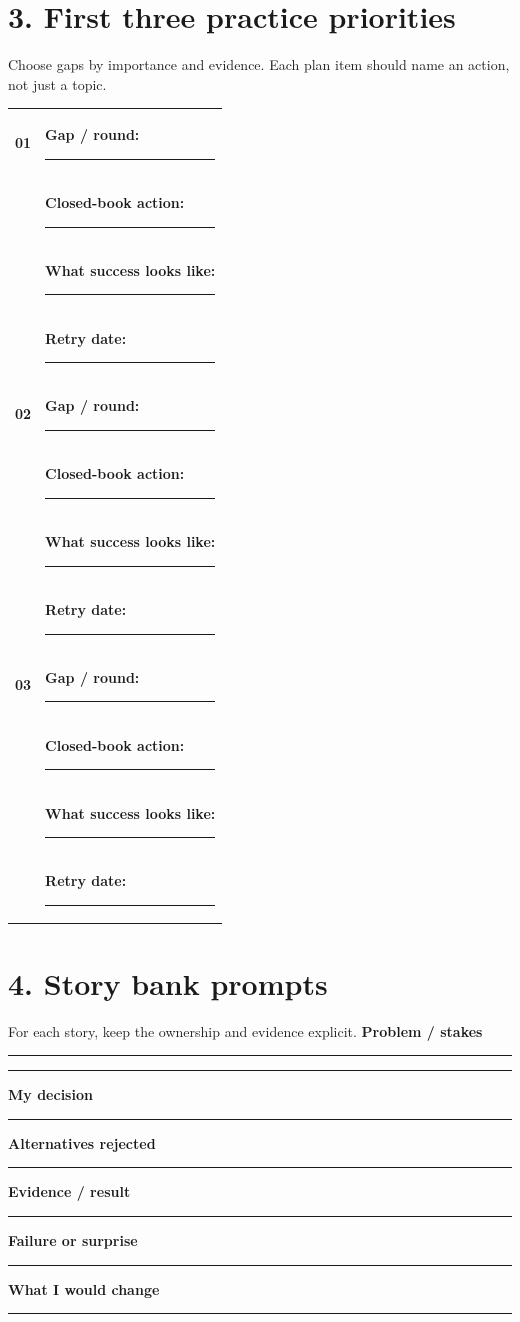 \documentclass[10pt,letterpaper]{article}
\newcommand{\longline}{\par\noindent\rule{\linewidth}{.35pt}\par\vspace{.35em}}
\begin{document}
\section*{3. First three practice priorities}
Choose gaps by importance and evidence. Each plan item should name an action, not just a topic.
\vspace{.08in}
\begin{tabularx}{\linewidth}{@{}p{.07\linewidth} X@{}}
\toprule
\textbf{01} & \textbf{Gap / round:} \rule{.48\hsize}{.35pt}\\[-1pt]
& \textbf{Closed-book action:} \rule{.45\hsize}{.35pt}\\[-1pt]
& \textbf{What success looks like:} \rule{.42\hsize}{.35pt}\\[-1pt]
& \textbf{Retry date:} \rule{.6\hsize}{.35pt}\\[.5em]
\midrule
\textbf{02} & \textbf{Gap / round:} \rule{.48\hsize}{.35pt}\\[-1pt]
& \textbf{Closed-book action:} \rule{.45\hsize}{.35pt}\\[-1pt]
& \textbf{What success looks like:} \rule{.42\hsize}{.35pt}\\[-1pt]
& \textbf{Retry date:} \rule{.6\hsize}{.35pt}\\[.5em]
\midrule
\textbf{03} & \textbf{Gap / round:} \rule{.48\hsize}{.35pt}\\[-1pt]
& \textbf{Closed-book action:} \rule{.45\hsize}{.35pt}\\[-1pt]
& \textbf{What success looks like:} \rule{.42\hsize}{.35pt}\\[-1pt]
& \textbf{Retry date:} \rule{.6\hsize}{.35pt}\\
\bottomrule
\end{tabularx}

\section*{4. Story bank prompts}
For each story, keep the ownership and evidence explicit.
\vspace{.08in}
\textbf{Problem / stakes}\par
\longline\longline
\textbf{My decision}\par
\longline
\textbf{Alternatives rejected}\par
\longline
\textbf{Evidence / result}\par
\longline
\textbf{Failure or surprise}\par
\longline
\textbf{What I would change}\par
\longline
\end{document}
